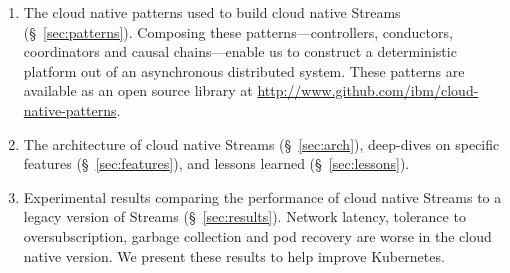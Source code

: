 \begin{enumerate}
    \item The cloud native patterns used to build cloud native Streams
	(\S~\ref{sec:patterns}). Composing these patterns---controllers,
	conductors, coordinators and causal chains---enable us to construct a
	deterministic platform out of an asynchronous distributed
	system. These patterns are available as an open source library at 
    \url{http://www.github.com/ibm/cloud-native-patterns}.

    \item The architecture of cloud native Streams (\S~\ref{sec:arch}),
    deep-dives on specific features (\S~\ref{sec:features}), and lessons 
    learned (\S~\ref{sec:lessons}).

    \item Experimental results comparing the performance of cloud native
    Streams to a legacy version of Streams (\S~\ref{sec:results}). Network 
    latency, tolerance to oversubscription, garbage collection and pod recovery 
    are worse in the cloud native version. We present these results to help 
    improve Kubernetes.
\end{enumerate}
